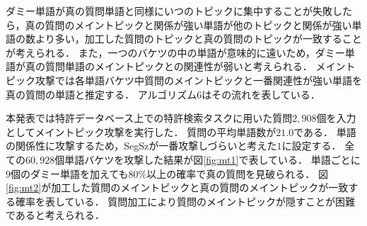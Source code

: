 \documentclass{jsarticle}
\theoremstyle{definition}
\begin{document}
ダミー単語が真の質問単語と同様にいつのトピックに集中することが失敗したら，真の質問のメイントピックと関係が強い単語が他のトピックと関係が強い単語の数より多い，加工した質問のトピックと真の質問のトピックが一致することが考えられる．
また，一つのバケツの中の単語が意味的に遠いため，ダミー単語が真の質問単語のメイントピックとの関連性が弱いと考えられる．
メイントピック攻撃では各単語バケツ中質問のメイントピックと一番関連性が強い単語を真の質問の単語と推定する．
アルゴリズム6はその流れを表している．

本発表では特許データベース上で\cite{fujii_overview_2007}の特許検索タスクに用いた質問$2,908$個を入力としてメイントピック攻撃を実行した．
質問の平均単語数が$21.0$である．
単語の関係性に攻撃するため，SegSzが一番攻撃しづらいと考えた$1$に設定する．
全ての$60,928$個単語バケツを攻撃した結果が図\ref{fig:mt1}で表している．
単語ごとに$9$個のダミー単語を加えても$80\%$以上の確率で真の質問を見破られる．
図\ref{fig:mt2}が加工した質問のメイントピックと真の質問のメイントピックが一致する確率を表している．
質問加工により質問のメイントピックが隠すことが困難であると考えられる．
\end{document}

